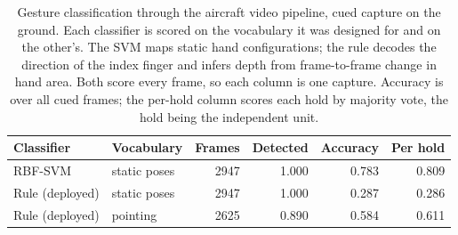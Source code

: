 \begin{table}[t]
\caption{Gesture classification through the aircraft video pipeline, cued capture on the ground. Each classifier is scored on the vocabulary it was designed for and on the other's. The SVM maps static hand configurations; the rule decodes the direction of the index finger and infers depth from frame-to-frame change in hand area. Both score every frame, so each column is one capture. Accuracy is over all cued frames; the per-hold column scores each hold by majority vote, the hold being the independent unit.}
\label{tab:operational}
\centering
\footnotesize
\setlength{\tabcolsep}{4pt}
\renewcommand{\arraystretch}{1.02}
\begin{tabular}{@{}llrrrr@{}}
\toprule
Classifier & Vocabulary & Frames & Detected & Accuracy & Per hold \\
\midrule
RBF-SVM & static poses & 2947 & 1.000 & 0.783 & 0.809 \\
Rule (deployed) & static poses & 2947 & 1.000 & 0.287 & 0.286 \\
Rule (deployed) & pointing & 2625 & 0.890 & 0.584 & 0.611 \\
\bottomrule
\end{tabular}
\end{table}
